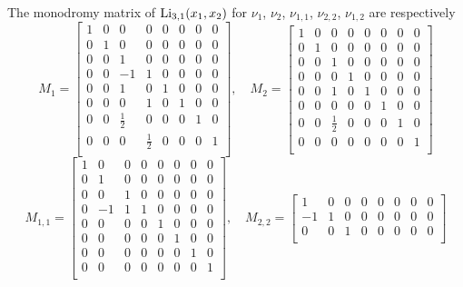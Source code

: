 \begin{example}
The monodromy matrix of $\operatorname{Li}_{3,1}(x_1,x_2)$ for $\nu_{1}$, $\nu_{2}$, $\nu_{1,1}$, $\nu_{2,2}$, $\nu_{1,2}$ are respectively
\[
M_{1}=\begin{bmatrix}
 1 & 0 & 0 & 0 & 0 & 0 & 0 & 0 \\
 0 & 1 & 0 & 0 & 0 & 0 & 0 & 0 \\
 0 & 0 & 1 & 0 & 0 & 0 & 0 & 0 \\
 0 & 0 & -1 & 1 & 0 & 0 & 0 & 0 \\
 0 & 0 & 1 & 0 & 1 & 0 & 0 & 0 \\
 0 & 0 & 0 & 1 & 0 & 1 & 0 & 0 \\
 0 & 0 & \frac{1}{2} & 0 & 0 & 0 & 1 & 0 \\
 0 & 0 & 0 & \frac{1}{2} & 0 & 0 & 0 & 1 \\
\end{bmatrix},\quad M_2=\begin{bmatrix}
 1 & 0 & 0 & 0 & 0 & 0 & 0 & 0 \\
 0 & 1 & 0 & 0 & 0 & 0 & 0 & 0 \\
 0 & 0 & 1 & 0 & 0 & 0 & 0 & 0 \\
 0 & 0 & 0 & 1 & 0 & 0 & 0 & 0 \\
 0 & 0 & 1 & 0 & 1 & 0 & 0 & 0 \\
 0 & 0 & 0 & 0 & 0 & 1 & 0 & 0 \\
 0 & 0 & \frac{1}{2} & 0 & 0 & 0 & 1 & 0 \\
 0 & 0 & 0 & 0 & 0 & 0 & 0 & 1 \\
\end{bmatrix}
\]
\[
M_{1,1}=\begin{bmatrix}
 1 & 0 & 0 & 0 & 0 & 0 & 0 & 0 \\
 0 & 1 & 0 & 0 & 0 & 0 & 0 & 0 \\
 0 & 0 & 1 & 0 & 0 & 0 & 0 & 0 \\
 0 & -1 & 1 & 1 & 0 & 0 & 0 & 0 \\
 0 & 0 & 0 & 0 & 1 & 0 & 0 & 0 \\
 0 & 0 & 0 & 0 & 0 & 1 & 0 & 0 \\
 0 & 0 & 0 & 0 & 0 & 0 & 1 & 0 \\
 0 & 0 & 0 & 0 & 0 & 0 & 0 & 1 \\
\end{bmatrix},\quad M_{2,2}=\begin{bmatrix}
 1 & 0 & 0 & 0 & 0 & 0 & 0 & 0 \\
 -1 & 1 & 0 & 0 & 0 & 0 & 0 & 0 \\
 0 & 0 & 1 & 0 & 0 & 0 & 0 & 0 \\

\end{bmatrix}\]
\end{example}
